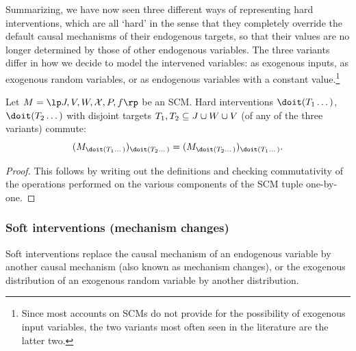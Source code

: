 Summarizing, we have now seen three different ways of representing hard interventions, which are all `hard' in the sense that they completely override the default causal mechanisms of their endogenous targets, so that their values are no longer determined by those of other endogenous variables. 
The three variants differ in how we decide to model the intervened variables: as exogenous inputs, as exogenous random variables, or as endogenous variables with a constant value.\footnote{Since most accounts on SCMs do not provide for the possibility of exogenous input variables, the two variants most often seen in the literature are the latter two.}

\begin{Prp}\label{prp:hard_interventions_commute}
Let $M = \lt \Sin, \Send, \Srnd, \CX, P, f \rt$ be an SCM.
Hard interventions $\doit(T_1\dots)$, $\doit(T_2\dots)$ with disjoint targets $T_1, T_2 \subseteq J \cup W \cup V$ (of any of the three variants) commute:
  $$(M_{\doit(T_1\dots)})_{\doit(T_2\dots)} = (M_{\doit(T_2\dots)})_{\doit(T_1\dots)}.$$
\end{Prp}
\begin{proof}
  This follows by writing out the definitions and checking commutativity of
  the operations performed on the various components of the SCM tuple one-by-one.
\end{proof}



\subsubsection{Soft interventions (mechanism changes)}

Soft interventions replace the causal mechanism of an endogenous variable by another causal mechanism (also known as mechanism changes),
or the exogenous distribution of an exogenous random variable by another distribution.

